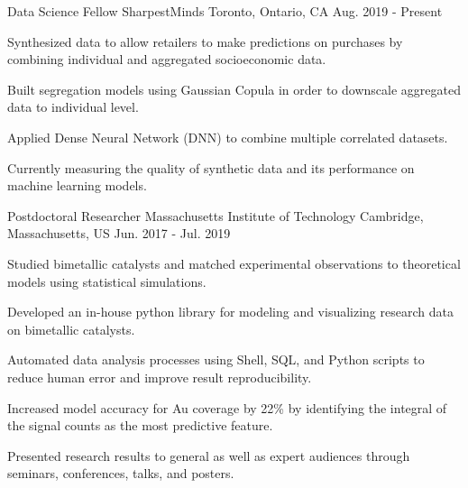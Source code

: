 


\begin{cventries}


\cventry
{Data Science Fellow}
{SharpestMinds}
{Toronto, Ontario, CA}
{Aug. 2019 - Present}
{
\begin{cvitems}
\item {Synthesized data to allow retailers to make predictions on
    purchases by combining individual and aggregated socioeconomic data.}
\item {Built segregation models using Gaussian Copula in order to downscale
    aggregated data to individual level.}
\item {Applied Dense Neural Network (DNN) to combine multiple correlated
    datasets.}
\item {Currently measuring the quality of synthetic data and its performance on
    machine learning models.}
\end{cvitems}
}

\cventry
{Postdoctoral Researcher}
{Massachusetts Institute of Technology}
{Cambridge, Massachusetts, US}
{Jun. 2017 - Jul. 2019}
{
\begin{cvitems}
\item {Studied bimetallic catalysts and matched experimental observations to
    theoretical models using statistical simulations.}
\item {Developed an in-house python library for modeling and visualizing
    research data on bimetallic catalysts.}
\item {Automated data analysis processes using Shell, SQL, and Python scripts to
    reduce human error and improve result reproducibility.}
\item {Increased model accuracy for Au coverage by 22\% by identifying the
    integral of the signal counts as the most predictive feature.}
\item {Presented research results to general as well as expert audiences
    through seminars, conferences, talks, and posters.}
\end{cvitems}
}


\end{cventries}
